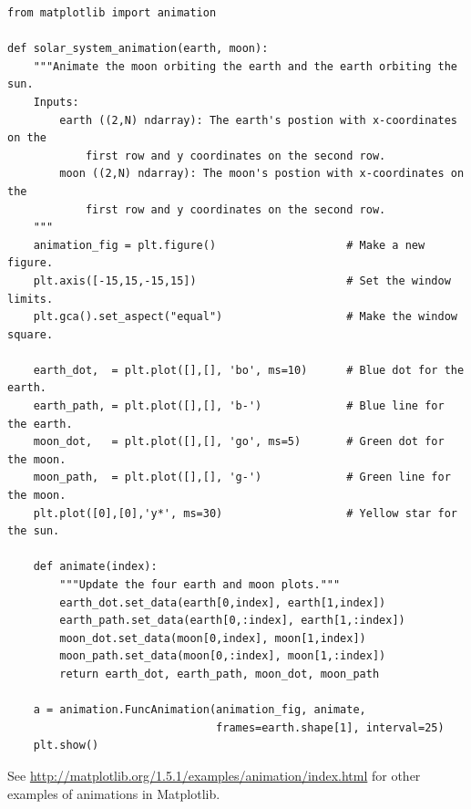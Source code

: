 \begin{lstlisting}
from matplotlib import animation

def solar_system_animation(earth, moon):
    """Animate the moon orbiting the earth and the earth orbiting the sun.
    Inputs:
        earth ((2,N) ndarray): The earth's postion with x-coordinates on the
            first row and y coordinates on the second row.
        moon ((2,N) ndarray): The moon's postion with x-coordinates on the
            first row and y coordinates on the second row.
    """
    animation_fig = plt.figure()                    # Make a new figure.
    plt.axis([-15,15,-15,15])                       # Set the window limits.
    plt.gca().set_aspect("equal")                   # Make the window square.

    earth_dot,  = plt.plot([],[], 'bo', ms=10)      # Blue dot for the earth.
    earth_path, = plt.plot([],[], 'b-')             # Blue line for the earth.
    moon_dot,   = plt.plot([],[], 'go', ms=5)       # Green dot for the moon.
    moon_path,  = plt.plot([],[], 'g-')             # Green line for the moon.
    plt.plot([0],[0],'y*', ms=30)                   # Yellow star for the sun.

    def animate(index):
        """Update the four earth and moon plots."""
        earth_dot.set_data(earth[0,index], earth[1,index])
        earth_path.set_data(earth[0,:index], earth[1,:index])
        moon_dot.set_data(moon[0,index], moon[1,index])
        moon_path.set_data(moon[0,:index], moon[1,:index])
        return earth_dot, earth_path, moon_dot, moon_path

    a = animation.FuncAnimation(animation_fig, animate,
                                frames=earth.shape[1], interval=25)
    plt.show()
\end{lstlisting}

See \url{http://matplotlib.org/1.5.1/examples/animation/index.html} for other examples of animations in Matplotlib.

